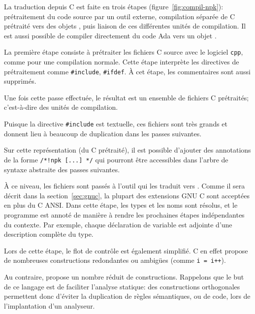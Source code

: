 La traduction depuis C est faite en trois étapes (figure~\ref{fig:compil-npk}):
prétraitement du code source par un outil externe, compilation séparée de C
prétraité vers des objets \newspeak{}, puis liaison de ces différentes unités de
compilation. Il est aussi possible de compiler directement du code Ada vers un
objet \newspeak{}.

La première étape consiste à prétraiter les fichiers C source avec le logiciel
\texttt{cpp}, comme pour une compilation normale. Cette étape interprète les
directives de prétraitement comme \texttt{\#include}, \texttt{\#ifdef}. À cet
étape, les commentaires sont aussi supprimés.


Une fois cette passe effectuée, le résultat est un ensemble de fichiers C
prétraités; c'est-à-dire des unités de compilation.

Puisque la directive \texttt{\#include} est textuelle, ces fichiers sont très
grands et donnent lieu à beaucoup de duplication dans les passes suivantes.


Sur cette représentation (du C prétraité), il est possible d'ajouter des
annotations de la forme \texttt{/*!npk [...] */} qui pourront être accessibles
dans l'arbre de syntaxe abstraite des passes suivantes.


À ce niveau, les fichiers sont passés à l'outil \ctonewspeak qui les
traduit vers \newspeak. Comme il sera décrit dans la section~\ref{sec:gnuc}, la
plupart des extensions GNU C sont acceptées en plus du C ANSI. Dans cette étape,
les types et les noms sont résolus, et le programme est annoté de manière à
rendre les prochaines étapes indépendantes du contexte. Par exemple, chaque
déclaration de variable est adjointe d'une description complète du type.

Lors de cette étape, le flot de contrôle est également simplifié. C en effet
propose de nombreuses constructions redondantes ou ambigües
(comme \texttt{i = i++}).


Au contraire, \newspeak propose un nombre réduit de constructions. Rappelons que
le but de ce langage est de faciliter l'analyse statique: des constructions
orthogonales permettent donc d'éviter la duplication de règles sémantiques, ou
de code, lors de l'implantation d'un analyseur.

